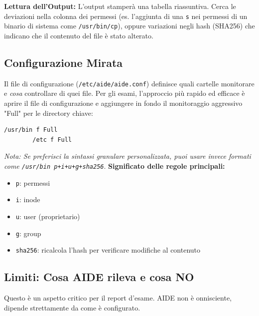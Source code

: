 \documentclass[12pt,a4paper]{report}
\begin{document}
	\textbf{Lettura dell'Output:}
	L'output stamperà una tabella riassuntiva. Cerca le deviazioni nella colonna dei permessi (es. l'aggiunta di una \texttt{s} nei permessi di un binario di sistema come \texttt{/usr/bin/cp}), oppure variazioni negli hash (SHA256) che indicano che il contenuto del file è stato alterato.
	
	\subsection{Configurazione Mirata}
	Il file di configurazione (\texttt{/etc/aide/aide.conf}) definisce quali cartelle monitorare e \textit{cosa} controllare di quei file. Per gli esami, l'approccio più rapido ed efficace è aprire il file di configurazione e aggiungere in fondo il monitoraggio aggressivo "Full" per le directory chiave:
	\begin{lstlisting}[language=bash]
		/usr/bin f Full
		/etc f Full
	\end{lstlisting}
	\textit{Nota: Se preferisci la sintassi granulare personalizzata, puoi usare invece formati come \texttt{/usr/bin p+i+u+g+sha256}}.
	\textbf{Significato delle regole principali:}
	\begin{itemize}
		\item \texttt{p}: permessi
		\item \texttt{i}: inode
		\item \texttt{u}: user (proprietario)
		\item \texttt{g}: group
		\item \texttt{sha256}: ricalcola l'hash per verificare modifiche al contenuto
	\end{itemize}
	
	\subsection{Limiti: Cosa AIDE rileva e cosa NO}
	Questo è un aspetto critico per il report d'esame. AIDE non è onnisciente, dipende strettamente da come è configurato. 
	
\end{document}
